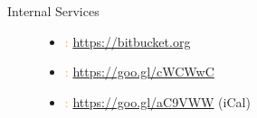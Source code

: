 \documentclass{tikzposter} %
\begin{document}
\begin{columns}
{\begin{center}
\begin{description}
		
		\item[Internal Services] \hfill
		\begin{itemize}
			\item \textcolor{orange}{\faBitbucket:} \url{https://bitbucket.org}
			\item \textcolor{orange}{\faCalendar:} \url{https://goo.gl/cWCWwC}
			\item \textcolor{orange}{\faCalendarCheckO:} \url{https://goo.gl/aC9VWW} (iCal)
		\end{itemize}
		
	\end{description}
\end{center}



}
\end{columns}
\end{document}
